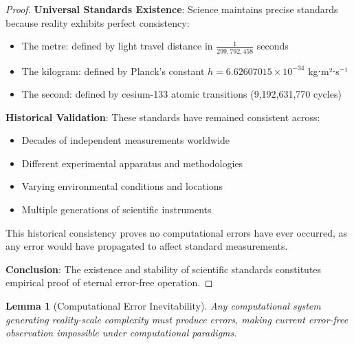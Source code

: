 \documentclass[12pt,a4paper]{article}
\newtheorem{lemma}[theorem]{Lemma}
\begin{document}
\begin{proof}
\textbf{Universal Standards Existence}: Science maintains precise standards because reality exhibits perfect consistency:
\begin{itemize}
    \item The metre: defined by light travel distance in $\frac{1}{299,792,458}$ seconds
    \item The kilogram: defined by Planck's constant $h = 6.62607015 \times 10^{-34}$ kg⋅m²⋅s⁻¹
    \item The second: defined by cesium-133 atomic transitions (9,192,631,770 cycles)
\end{itemize}

\textbf{Historical Validation}: These standards have remained consistent across:
\begin{itemize}
    \item Decades of independent measurements worldwide
    \item Different experimental apparatus and methodologies
    \item Varying environmental conditions and locations
    \item Multiple generations of scientific instruments
\end{itemize}

This historical consistency proves no computational errors have ever occurred, as any error would have propagated to affect standard measurements.

\textbf{Conclusion}: The existence and stability of scientific standards constitutes empirical proof of eternal error-free operation.
\end{proof}

\begin{lemma}[Computational Error Inevitability]
Any computational system generating reality-scale complexity must produce errors, making current error-free observation impossible under computational paradigms.
\end{lemma}
\end{document}
